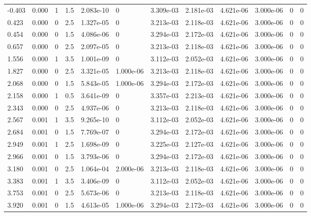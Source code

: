 \documentclass[preview]{standalone}
\begin{document}
{{\begin{tabular}{L{1.2cm}C{1.2cm} C{0.3cm}C{0.5cm} C{1.4cm}C{1.4cm} C{1.4cm}C{1.4cm} C{1.6cm}C{1.6cm} C{1.6cm}C{1.6cm}}
  -0.403  &  0.000  & 1     & 1.5 &  2.083e-10  & 0  &  3.309e-03&   2.181e-03& 4.621e-06 & 3.000e-06   &  0 & 0  \\ 
  0.423  &  0.000  & 0     & 2.5 &  1.327e-05  & 0  &  3.213e-03&   2.118e-03& 4.621e-06 & 3.000e-06   &  0 & 0  \\ 
  0.454  &  0.000  & 0     & 1.5 &  4.086e-06  & 0  &  3.294e-03&   2.172e-03& 4.621e-06 & 3.000e-06   &  0 & 0  \\ 
  0.657  &  0.000  & 0     & 2.5 &  2.097e-05  & 0  &  3.213e-03&   2.118e-03& 4.621e-06 & 3.000e-06   &  0 & 0  \\ 
  1.556  &  0.000  & 1     & 3.5 &  1.001e-09  & 0  &  3.112e-03&   2.052e-03& 4.621e-06 & 3.000e-06   &  0 & 0  \\ 
  1.827  &  0.000  & 0     & 2.5 &  3.321e-05  & 1.000e-06  &  3.213e-03&   2.118e-03& 4.621e-06 & 3.000e-06   &  0 & 0  \\ 
  2.068  &  0.000  & 0     & 1.5 &  5.843e-05  & 1.000e-06  &  3.294e-03&   2.172e-03& 4.621e-06 & 3.000e-06   &  0 & 0  \\ 
  2.158  &  0.000  & 1     & 0.5 &  3.641e-09  & 0  &  3.357e-03&   2.213e-03& 4.621e-06 & 3.000e-06   &  0 & 0  \\ 
  2.343  &  0.000  & 0     & 2.5 &  4.937e-06  & 0  &  3.213e-03&   2.118e-03& 4.621e-06 & 3.000e-06   &  0 & 0  \\ 
  2.567  &  0.001  & 1     & 3.5 &  9.265e-10  & 0  &  3.112e-03&   2.052e-03& 4.621e-06 & 3.000e-06   &  0 & 0  \\ 
  2.684  &  0.001  & 0     & 1.5 &  7.769e-07  & 0  &  3.294e-03&   2.172e-03& 4.621e-06 & 3.000e-06   &  0 & 0  \\ 
  2.949  &  0.001  & 1     & 2.5 &  1.698e-09  & 0  &  3.225e-03&   2.127e-03& 4.621e-06 & 3.000e-06   &  0 & 0  \\ 
  2.966  &  0.001  & 0     & 1.5 &  3.793e-06  & 0  &  3.294e-03&   2.172e-03& 4.621e-06 & 3.000e-06   &  0 & 0  \\ 
  3.180  &  0.001  & 0     & 2.5 &  1.064e-04  & 2.000e-06  &  3.213e-03&   2.118e-03& 4.621e-06 & 3.000e-06   &  0 & 0  \\ 
  3.383  &  0.001  & 1     & 3.5 &  3.406e-09  & 0  &  3.112e-03&   2.052e-03& 4.621e-06 & 3.000e-06   &  0 & 0  \\ 
  3.753  &  0.001  & 0     & 2.5 &  5.673e-06  & 0  &  3.213e-03&   2.118e-03& 4.621e-06 & 3.000e-06   &  0 & 0  \\ 
  3.920  &  0.001  & 0     & 1.5 &  4.613e-05  & 1.000e-06  &  3.294e-03&   2.172e-03& 4.621e-06 & 3.000e-06   &  0 & 0  \\ 

\end{tabular}}}
\end{document}
